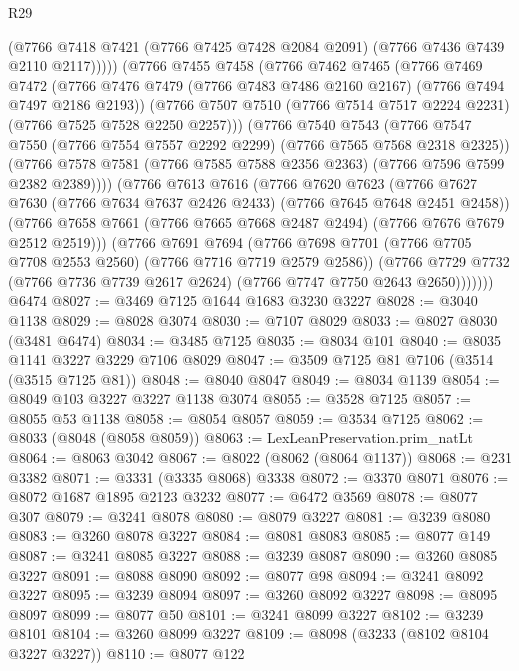 \begin{lexlean}{R29}
\begin{coremodule}
              (@7766 @7418 @7421 (@7766 @7425 @7428 @2084 @2091) (@7766 @7436 @7439 @2110 @2117)))))
        (@7766
          @7455
          @7458
          (@7766
            @7462
            @7465
            (@7766
              @7469
              @7472
              (@7766 @7476 @7479 (@7766 @7483 @7486 @2160 @2167) (@7766 @7494 @7497 @2186 @2193))
              (@7766 @7507 @7510 (@7766 @7514 @7517 @2224 @2231) (@7766 @7525 @7528 @2250 @2257)))
            (@7766
              @7540
              @7543
              (@7766 @7547 @7550 (@7766 @7554 @7557 @2292 @2299) (@7766 @7565 @7568 @2318 @2325))
              (@7766 @7578 @7581 (@7766 @7585 @7588 @2356 @2363) (@7766 @7596 @7599 @2382 @2389))))
          (@7766
            @7613
            @7616
            (@7766
              @7620
              @7623
              (@7766 @7627 @7630 (@7766 @7634 @7637 @2426 @2433) (@7766 @7645 @7648 @2451 @2458))
              (@7766 @7658 @7661 (@7766 @7665 @7668 @2487 @2494) (@7766 @7676 @7679 @2512 @2519)))
            (@7766
              @7691
              @7694
              (@7766 @7698 @7701 (@7766 @7705 @7708 @2553 @2560) (@7766 @7716 @7719 @2579 @2586))
              (@7766
                @7729
                @7732
                (@7766 @7736 @7739 @2617 @2624)
                (@7766 @7747 @7750 @2643 @2650)))))))
    @6474
@8027 := @3469 @7125 @1644 @1683 @3230 @3227
@8028 := @3040 @1138
@8029 := @8028 @3074
@8030 := @7107 @8029
@8033 := @8027 @8030 (@3481 @6474)
@8034 := @3485 @7125
@8035 := @8034 @101
@8040 := @8035 @1141 @3227 @3229 @7106 @8029
@8047 := @3509 @7125 @81 @7106 (@3514 (@3515 @7125 @81))
@8048 := @8040 @8047
@8049 := @8034 @1139
@8054 := @8049 @103 @3227 @3227 @1138 @3074
@8055 := @3528 @7125
@8057 := @8055 @53 @1138
@8058 := @8054 @8057
@8059 := @3534 @7125
@8062 := @8033 (@8048 (@8058 @8059))
@8063 := LexLeanPreservation.prim_natLt
@8064 := @8063 @3042
@8067 := @8022 (@8062 (@8064 @1137))
@8068 := @231 @3382
@8071 := @3331 (@3335 @8068) @3338
@8072 := @3370 @8071
@8076 := @8072 @1687 @1895 @2123 @3232
@8077 := @6472 @3569
@8078 := @8077 @307
@8079 := @3241 @8078
@8080 := @8079 @3227
@8081 := @3239 @8080
@8083 := @3260 @8078 @3227
@8084 := @8081 @8083
@8085 := @8077 @149
@8087 := @3241 @8085 @3227
@8088 := @3239 @8087
@8090 := @3260 @8085 @3227
@8091 := @8088 @8090
@8092 := @8077 @98
@8094 := @3241 @8092 @3227
@8095 := @3239 @8094
@8097 := @3260 @8092 @3227
@8098 := @8095 @8097
@8099 := @8077 @50
@8101 := @3241 @8099 @3227
@8102 := @3239 @8101
@8104 := @3260 @8099 @3227
@8109 := @8098 (@3233 (@8102 @8104 @3227 @3227))
@8110 := @8077 @122

\end{coremodule}
\end{lexlean}
